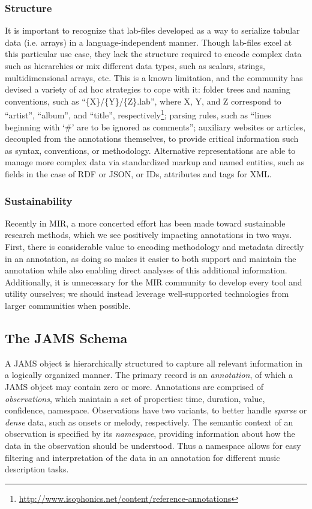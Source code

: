 \subsubsection{Structure}
\label{subsubsec:structure}
It is important to recognize that lab-files developed as a way to serialize tabular data (i.e. arrays) in a language-independent manner.
Though lab-files excel at this particular use case, they lack the structure required to encode complex data such as hierarchies or mix different data types, such as scalars, strings, multidimensional arrays, etc.
This is a known limitation, and the community has devised a variety of ad hoc strategies to cope with it: folder trees and naming conventions, such as ``\{X\}/\{Y\}/\{Z\}.lab'', where X, Y, and Z correspond to ``artist'', ``album'', and ``title'', respectively\footnote{\url{http://www.isophonics.net/content/reference-annotations}}; parsing rules, such as ``lines beginning with `\#' are to be ignored as comments''; auxiliary websites or articles, decoupled from the annotations themselves, to provide critical information such as syntax, conventions, or methodology.
Alternative representations are able to manage more complex data via standardized markup and named entities, such as fields in the case of RDF or JSON, or IDs, attributes and tags for XML.

\subsubsection{Sustainability}
\label{subsubsec:sustainability}

Recently in MIR, a more concerted effort has been made toward sustainable research methods, which we see positively impacting annotations in two ways.
First, there is considerable value to encoding methodology and metadata directly in an annotation, as doing so makes it easier to both support and maintain the annotation while also enabling direct analyses of this additional information.
Additionally, it is unnecessary for the MIR community to develop every tool and utility ourselves; we should instead leverage well-supported technologies from larger communities when possible.

\subsection{The JAMS Schema}
\label{subsec:schema}

A JAMS object is hierarchically structured to capture all relevant information in a logically organized manner.
The primary record is an \emph{annotation}, of which a JAMS object may contain zero or more.
Annotations are comprised of \emph{observations}, which maintain a set of properties: time, duration, value, confidence, namespace.
Observations have two variants, to better handle \emph{sparse} or \emph{dense} data, such as onsets or melody, respectively.
The semantic context of an observation is specified by its \emph{namespace}, providing information about how the data in the observation should be understood.
Thus a namespace allows for easy filtering and interpretation of the data in an annotation for different music description tasks.

